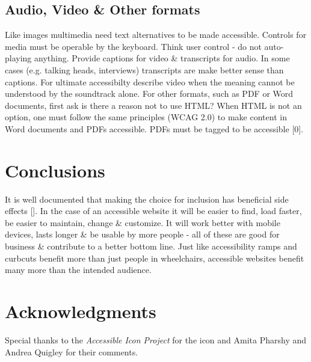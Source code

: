 \documentclass{acm_proc_article-sp}
\begin{document}
\subsection{Audio, Video \& Other formats}
Like images multimedia need text alternatives to be made accessible. Controls for media must be operable by the keyboard. Think user control - do not auto-playing anything. Provide captions for video \& transcripts for audio. In some cases (e.g. talking heads, interviews) transcripts are make better sense than captions. For ultimate accessibilty describe video when the meaning cannot be understood by the soundtrack alone. For other formats, such as PDF or Word documents, first ask is there a reason not to use HTML? When HTML is not an option, one must follow the same principles (WCAG 2.0) to make content in Word documents and PDFs accessible. PDFs must be tagged to be accessible [0].

\section{Conclusions}
 It is well documented that making the choice for inclusion has beneficial side effects []. In the case of an accessible website it will be easier to find, load faster, be easier to maintain, change \& customize. It will work better with mobile devices, lasts longer \& be usable by more people - all of these are good for business \& contribute to a better bottom line. Just like accessibility ramps and curbcuts benefit more than just people in wheelchairs, accessible websites benefit many more than the intended audience.

\section{Acknowledgments}
Special thanks to the {\it Accessible Icon Project} for the icon and Amita Pharshy and Andrea Quigley for their comments.

\end{document}
